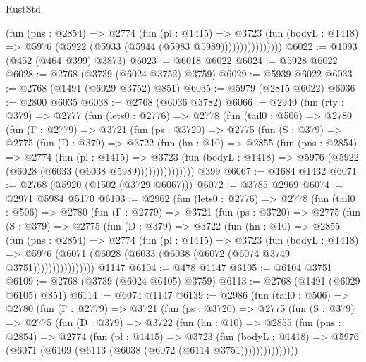 \begin{lexlean}{RustStd}
\begin{coremodule}
                      (fun (pns : @2854) =>
                      @2774
                        (fun (pl : @1415) =>
                        @3723
                          (fun (bodyL : @1418) =>
                          @5976 (@5922 (@5933 (@5944 (@5983 @5989))))))))))))))))
@6022 := @1093 (@452 (@464 @399) @3873)
@6023 := @6018 @6022
@6024 := @5928 @6022
@6028 := @2768 (@3739 (@6024 @3752) @3759)
@6029 := @5939 @6022
@6033 := @2768 (@1491 (@6029 @3752) @851)
@6035 := @5979 (@2815 @6022)
@6036 := @2800 @6035
@6038 := @2768 (@6036 @3782)
@6066 := @2940
    (fun (rty : @379) =>
    @2777
      (fun (lets0 : @2776) =>
      @2778
        (fun (tail0 : @506) =>
        @2780
          (fun (Γ : @2779) =>
          @3721
            (fun (ps : @3720) =>
            @2775
              (fun (S : @379) =>
              @2775
                (fun (D : @379) =>
                @3722
                  (fun (hn : @10) =>
                  @2855
                    (fun (pns : @2854) =>
                    @2774
                      (fun (pl : @1415) =>
                      @3723
                        (fun (bodyL : @1418) =>
                        @5976 (@5922 (@6028 (@6033 (@6038 @5989)))))))))))))))
    @399
@6067 := @1684 @1432
@6071 := @2768 (@5920 (@1502 (@3729 @6067)))
@6072 := @3785 @2969
@6074 := @2971 @5984 @5170
@6103 := @2962
    (fun (lets0 : @2776) =>
    @2778
      (fun (tail0 : @506) =>
      @2780
        (fun (Γ : @2779) =>
        @3721
          (fun (ps : @3720) =>
          @2775
            (fun (S : @379) =>
            @2775
              (fun (D : @379) =>
              @3722
                (fun (hn : @10) =>
                @2855
                  (fun (pns : @2854) =>
                  @2774
                    (fun (pl : @1415) =>
                    @3723
                      (fun (bodyL : @1418) =>
                      @5976 (@6071 (@6028 (@6033 (@6038 (@6072 (@6074 @3749 @3751))))))))))))))))
    @1147
@6104 := @478 @1147
@6105 := @6104 @3751
@6109 := @2768 (@3739 (@6024 @6105) @3759)
@6113 := @2768 (@1491 (@6029 @6105) @851)
@6114 := @6074 @1147
@6139 := @2986
    (fun (tail0 : @506) =>
    @2780
      (fun (Γ : @2779) =>
      @3721
        (fun (ps : @3720) =>
        @2775
          (fun (S : @379) =>
          @2775
            (fun (D : @379) =>
            @3722
              (fun (hn : @10) =>
              @2855
                (fun (pns : @2854) =>
                @2774
                  (fun (pl : @1415) =>
                  @3723
                    (fun (bodyL : @1418) =>
                    @5976 (@6071 (@6109 (@6113 (@6038 (@6072 (@6114 @3751)))))))))))))))

\end{coremodule}
\end{lexlean}
